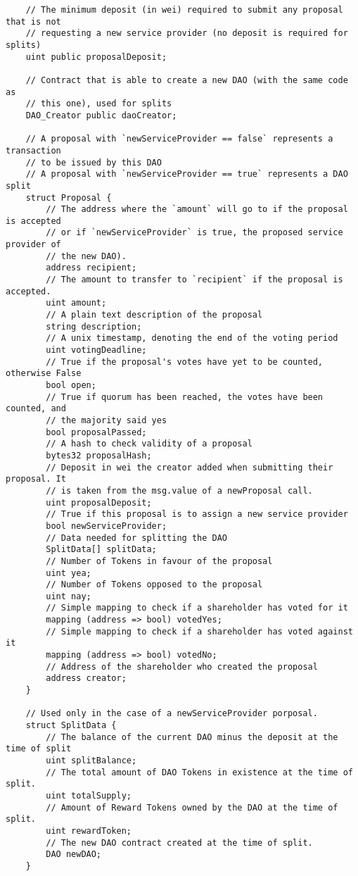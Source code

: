 \documentclass[9pt,oneside]{amsart}
\begin{document}
\begin{appendix}
\begin{verbatim}
    // The minimum deposit (in wei) required to submit any proposal that is not
    // requesting a new service provider (no deposit is required for splits)
    uint public proposalDeposit;

    // Contract that is able to create a new DAO (with the same code as
    // this one), used for splits
    DAO_Creator public daoCreator;

    // A proposal with `newServiceProvider == false` represents a transaction
    // to be issued by this DAO
    // A proposal with `newServiceProvider == true` represents a DAO split
    struct Proposal {
        // The address where the `amount` will go to if the proposal is accepted
        // or if `newServiceProvider` is true, the proposed service provider of
        // the new DAO).
        address recipient;
        // The amount to transfer to `recipient` if the proposal is accepted.
        uint amount;
        // A plain text description of the proposal
        string description;
        // A unix timestamp, denoting the end of the voting period
        uint votingDeadline;
        // True if the proposal's votes have yet to be counted, otherwise False
        bool open;
        // True if quorum has been reached, the votes have been counted, and
        // the majority said yes
        bool proposalPassed;
        // A hash to check validity of a proposal
        bytes32 proposalHash;
        // Deposit in wei the creator added when submitting their proposal. It
        // is taken from the msg.value of a newProposal call.
        uint proposalDeposit;
        // True if this proposal is to assign a new service provider
        bool newServiceProvider;
        // Data needed for splitting the DAO
        SplitData[] splitData;
        // Number of Tokens in favour of the proposal
        uint yea;
        // Number of Tokens opposed to the proposal
        uint nay;
        // Simple mapping to check if a shareholder has voted for it
        mapping (address => bool) votedYes;
        // Simple mapping to check if a shareholder has voted against it
        mapping (address => bool) votedNo;
        // Address of the shareholder who created the proposal
        address creator;
    }

    // Used only in the case of a newServiceProvider porposal.
    struct SplitData {
        // The balance of the current DAO minus the deposit at the time of split
        uint splitBalance;
        // The total amount of DAO Tokens in existence at the time of split.
        uint totalSupply;
        // Amount of Reward Tokens owned by the DAO at the time of split.
        uint rewardToken;
        // The new DAO contract created at the time of split.
        DAO newDAO;
    }


\end{verbatim}
\end{appendix}
\end{document}
